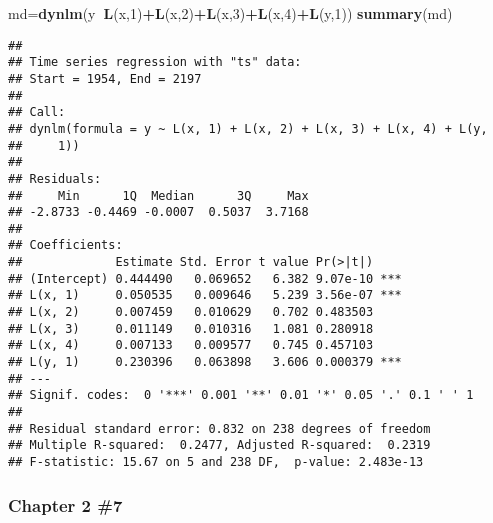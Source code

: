 \documentclass[]{article}
\newenvironment{Shaded}{\begin{snugshade}}{\end{snugshade}}
\newcommand{\KeywordTok}[1]{\textcolor[rgb]{0.13,0.29,0.53}{\textbf{#1}}}
\newcommand{\DecValTok}[1]{\textcolor[rgb]{0.00,0.00,0.81}{#1}}
\newcommand{\OperatorTok}[1]{\textcolor[rgb]{0.81,0.36,0.00}{\textbf{#1}}}
\newcommand{\NormalTok}[1]{#1}
\begin{document}
\begin{Shaded}
\begin{Highlighting}[]
\NormalTok{md=}\KeywordTok{dynlm}\NormalTok{(y}\OperatorTok{~}\KeywordTok{L}\NormalTok{(x,}\DecValTok{1}\NormalTok{)}\OperatorTok{+}\KeywordTok{L}\NormalTok{(x,}\DecValTok{2}\NormalTok{)}\OperatorTok{+}\KeywordTok{L}\NormalTok{(x,}\DecValTok{3}\NormalTok{)}\OperatorTok{+}\KeywordTok{L}\NormalTok{(x,}\DecValTok{4}\NormalTok{)}\OperatorTok{+}\KeywordTok{L}\NormalTok{(y,}\DecValTok{1}\NormalTok{))}
\KeywordTok{summary}\NormalTok{(md)}
\end{Highlighting}
\end{Shaded}

\begin{verbatim}
## 
## Time series regression with "ts" data:
## Start = 1954, End = 2197
## 
## Call:
## dynlm(formula = y ~ L(x, 1) + L(x, 2) + L(x, 3) + L(x, 4) + L(y, 
##     1))
## 
## Residuals:
##     Min      1Q  Median      3Q     Max 
## -2.8733 -0.4469 -0.0007  0.5037  3.7168 
## 
## Coefficients:
##             Estimate Std. Error t value Pr(>|t|)    
## (Intercept) 0.444490   0.069652   6.382 9.07e-10 ***
## L(x, 1)     0.050535   0.009646   5.239 3.56e-07 ***
## L(x, 2)     0.007459   0.010629   0.702 0.483503    
## L(x, 3)     0.011149   0.010316   1.081 0.280918    
## L(x, 4)     0.007133   0.009577   0.745 0.457103    
## L(y, 1)     0.230396   0.063898   3.606 0.000379 ***
## ---
## Signif. codes:  0 '***' 0.001 '**' 0.01 '*' 0.05 '.' 0.1 ' ' 1
## 
## Residual standard error: 0.832 on 238 degrees of freedom
## Multiple R-squared:  0.2477, Adjusted R-squared:  0.2319 
## F-statistic: 15.67 on 5 and 238 DF,  p-value: 2.483e-13
\end{verbatim}

\subsubsection{Chapter 2 \#7}\label{chapter-2-7}
\end{document}
